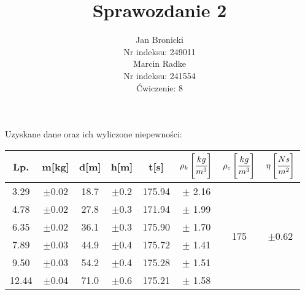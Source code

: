 \documentclass{article}
\title{Sprawozdanie 2}
\author{Jan Bronicki \\
Nr indeksu: 249011\\
Marcin Radke\\
Nr indeksu: 241554\\
Ćwiczenie: 8}
\date{}
\begin{document}
\maketitle
\begin{table}[h]
    \begin{flushleft}
        Uzyskane dane oraz ich wyliczone niepewności:\\
    \end{flushleft}
    \renewcommand{\arraystretch}{1.5}
\begin{tabular}{ |c|c|c|c|c|c|c|c| }
    \hline
    Lp.&m[kg]&d[m]&h[m]&t[s]&$\rho_k \left[\cfrac{kg}{m^3}\right]$&$\rho_c \left[\cfrac{kg}{m^3}\right]$&$\eta \left[\cfrac{Ns}{m^2}\right]$ \\
    \hline \hline
    3.29&$\pm$0.02&18.7&$\pm$0.2&175.94&$\pm $ 2.16& \multirow{6}{*}{175}&\multirow{6}{*}{$\pm$0.62}\\ 
    \cline{1-6}
    4.78&$\pm$0.02&27.8&$\pm$0.3&171.94&$\pm$ 1.99&&\\ 
    \cline{1-6}
  
    6.35&$\pm$0.02&36.1&$\pm$0.3&175.90&$\pm$ 1.70&&\\ 
    \cline{1-6}

    7.89&$\pm$0.03&44.9&$\pm$0.4&175.72&$\pm$ 1.41&&\\ 
    \cline{1-6}

    9.50&$\pm$0.03&54.2&$\pm$0.4&175.28&$\pm$ 1.51&&\\ 
    \cline{1-6}
    
    12.44&$\pm$0.04&71.0&$\pm$0.6&175.21&$\pm$ 1.58&&\\ 

    \hline

\end{tabular}
\label{tabular: t}
\centering
\end{table}
\end{document}
